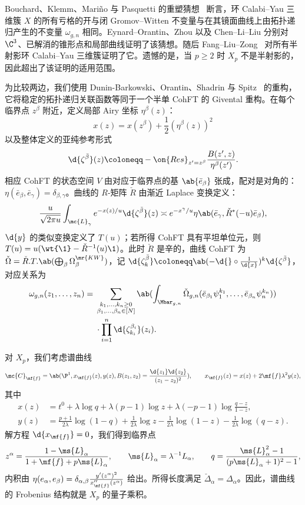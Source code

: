 Bouchard、Klemm、Mari\~{n}o 与 Pasquetti 的重塑猜想~\cite{BKMP2009} 断言，环 Calabi--Yau 三维簇 \(X\) 的所有亏格的开与闭 Gromov--Witten 不变量与在其镜面曲线上由拓扑递归产生的不变量 \(\omega_{g,n}\) 相同。Eynard--Orantin、Zhou 以及 Chen--Li--Liu 分别对 \(\C^3\)、已解消的锥形点和局部曲线证明了该猜想。随后 Fang--Liu--Zong~\cite{FLZ2020} 对所有半射影环 Calabi--Yau 三维簇证明了它。遗憾的是，当 \(p \geq 2\) 时 \(X_p\) 不是半射影的，因此超出了该证明的适用范围。

为比较两边，我们使用 Dunin-Barkowski、Orantin、Shadrin 与 Spitz~\cite{DOSS2014} 的重构，它将稳定的拓扑递归关联函数等同于一个半单 CohFT 的 Givental 重构。在每个临界点 \(z^{\beta}\) 附近，定义局部 Airy 坐标 \(\eta^{\beta}(z)\)：
\[ x(z) = x(z^{\beta}) + \frac{1}{2}(\eta^{\beta}(z))^2 \]
以及整体定义的亚纯参考形式
\[ \d{\zeta^{\bar{\beta}}}(z) \coloneqq -\on{Res}_{z'=z^{\beta}}\frac{B(z',z)}{\eta^{\beta}(z')}. \]
相应 CohFT 的状态空间 \(V\) 由对应于临界点的基 \(\ab\{\bar{e}_{\beta}\}\) 张成，配对是对角的：\(\eta(\bar{e}_{\beta},\bar{e}_{\gamma}) = \delta_{\beta,\gamma}\)。曲线的 \(R\)-矩阵 \(\check{R}\) 由渐近 Laplace 变换定义：
\[ \frac{u}{\sqrt{2\pi u}}\int_{\mc{L}_{\gamma}} e^{-x(z)/u}\d{\zeta^{\bar{\beta}}}(z) \asymp e^{-x^{\gamma}/u}\eta\ab(\bar{e}_{\gamma}, \check{R}^*(-u)\bar{e}_{\beta}), \]
\(\d{y}\) 的类似变换定义了 \(T(u)\)；若所得 CohFT 具有平坦单位元，则 \(T(u) = u(\wt{\1}-\check{R}^{-1}(u)\1)\)。此时 \(\check{R}\) 是辛的，曲线 CohFT 为 \(\check{\Omega} = \check{R}.T.\ab(\bigoplus_{\beta}\Omega^{\mr{KW}}_{\beta})\)，记 \(\d{\zeta^{\bar{\beta}}_k} \coloneqq \ab(-\d{} \circ \frac{1}{\d{x}})^k \d{\zeta^{\bar{\beta}}}\)，对应关系为
\begin{align*}
    \omega_{g,n}(z_1,\ldots,z_n) ={}& \sum_{\substack{k_1,\ldots,k_n \geq 0 \\ \beta_1,\ldots,\beta_n \in [N]}}\ab(\int_{\Mbar_{g,n}} \check{\Omega}_{g,n}(\bar{e}_{\beta_1}\psi_1^{k_1},\ldots,\bar{e}_{\beta_n}\psi_n^{k_n})) \\
    &\cdot \prod_{i=1}^n \d{\zeta^{\beta_i}_{k_i}}(z_i).
\end{align*}

对 \(X_p\)，我们考虑谱曲线
\[ \mc{C}_{\mf{f}} = \ab(\P^1, x_{\mf{f}}(z), y(z), B(z_1,z_2) = \frac{\d{z_1}\d{z_2}}{(z_1-z_2)^2}), \qquad x_{\mf{f}}(z) = x(z) + 2\mf{f}\lambda^2 y(z), \]
其中
\begin{align*}
    x(z) &= t^0 + \lambda \log q + \lambda(p-1)\log z + \lambda(-p-1)\log\frac{q-z}{1-z}, \\
    y(z) &= \frac{p+1}{2\lambda}\log(1-q) + \frac{1}{2\lambda}\log z - \frac{1}{2\lambda}\log(1-z) - \frac{1}{2\lambda}\log(q-z).
\end{align*}
解方程 \(\d{x_{\mf{f}}} = 0\)，我们得到临界点
\[ z^{\alpha} = \frac{1-\ms{L}_{\alpha}}{1+\mf{f}+p\ms{L}_{\alpha}}, \qquad \ms{L}_{\alpha} = \lambda^{-1}L_{\alpha}, \qquad q = \frac{\ms{L}_{\alpha}^2-1}{(p\ms{L}_{\alpha}+1)^2-1}, \]
内积由 \(\eta(e_{\alpha},e_{\beta}) = \delta_{\alpha,\beta}\frac{y'(z^{\alpha})^2}{x''_{\mf{f}}(z^{\alpha})}\) 给出。所得长度满足 \(\check{\Delta}_{\alpha} = \Delta_{\alpha}\)。因此，谱曲线的 Frobenius 结构就是 \(X_p\) 的量子乘积。

